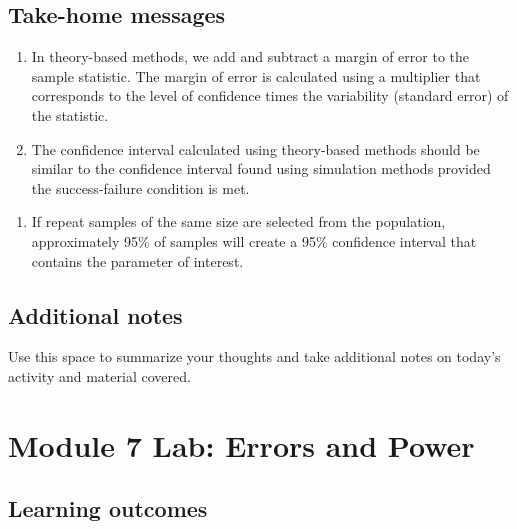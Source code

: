 \documentclass[
]{report}
\providecommand{\tightlist}{%
  \setlength{\itemsep}{0pt}\setlength{\parskip}{0pt}}
\begin{document}
\vspace{0.8in}

\hypertarget{take-home-messages-11}{%
\subsection{Take-home messages}\label{take-home-messages-11}}

\begin{enumerate}
\def\labelenumi{\arabic{enumi}.}
\item
  In theory-based methods, we add and subtract a margin of error to the sample statistic. The margin of error is calculated using a multiplier that corresponds to the level of confidence times the variability (standard error) of the statistic.
\item
  The confidence interval calculated using theory-based methods should be similar to the confidence interval found using simulation methods provided the success-failure condition is met.
\end{enumerate}

\begin{enumerate}
\def\labelenumi{\arabic{enumi}.}
\setcounter{enumi}{2}
\tightlist
\item
  If repeat samples of the same size are selected from the population, approximately 95\% of samples will create a 95\% confidence interval that contains the parameter of interest.
\end{enumerate}

\hypertarget{additional-notes-11}{%
\subsection{Additional notes}\label{additional-notes-11}}

Use this space to summarize your thoughts and take additional notes on today's activity and material covered.

\newpage

\hypertarget{module-7-lab-errors-and-power}{%
\section{Module 7 Lab: Errors and Power}\label{module-7-lab-errors-and-power}}


\hypertarget{learning-outcomes-13}{%
\subsection{Learning outcomes}\label{learning-outcomes-13}}
\end{document}
